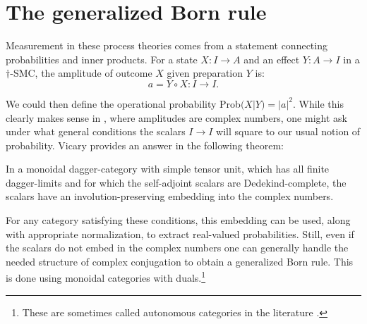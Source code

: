 \section{The generalized Born rule}
\label{sec:bornrule}
Measurement in these process theories comes from a statement connecting probabilities and inner products. For a state $X:I\to A$ and an effect $Y:A\to I$ in a $\dagger$-SMC, the amplitude of outcome $X$ given preparation $Y$ is:
\begin{equation}
a = Y\circ X:I\to I.
\end{equation}


\noindent We could then define the operational probability Prob$(X|Y)=|a|^2$. While this clearly makes sense in , where amplitudes are complex numbers, one might ask under what general conditions the scalars $I\to I$ will square to our usual notion of probability. Vicary provides an answer in the following theorem:
\begin{theorem}{\cite[Thm 4.2]{vicary2011completeness}}
In a monoidal dagger-category with simple tensor unit, which has all finite dagger-limits and for which the self-adjoint scalars are Dedekind-complete, the scalars have an involution-preserving embedding into the complex numbers.
\end{theorem}
\noindent For any category satisfying these conditions, this embedding can be used, along with appropriate normalization, to extract real-valued probabilities. Still, even if the scalars do not embed in the complex numbers one can generally handle the needed structure of complex conjugation to obtain a generalized Born rule. This is done using monoidal categories with duals.\footnote{These are sometimes called autonomous categories in the literature \cite{joyal1993braided,selinger2011survey}.}


